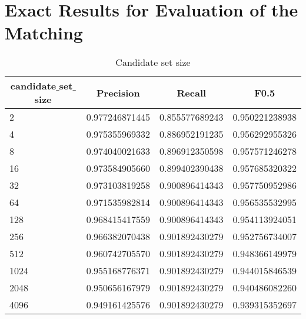\section{Exact Results for Evaluation of the Matching}


\begin{table}[h!]
\centering
\begin{tabular}{l|l|l|l}
\multicolumn{1}{c|}{\bfseries candidate$\_$set$\_$size} & \multicolumn{1}{|c|}{\bfseries Precision} & \multicolumn{1}{|c|}{\bfseries Recall} & \multicolumn{1}{|c}{\bfseries F0.5}
\\ \hline \hline


2    & 0.977246871445 & 0.855577689243 & 0.950221238938 \\ \hline
4    & 0.975355969332 & 0.886952191235 & 0.956292955326 \\ \hline
8    & 0.974040021633 & 0.896912350598 & 0.957571246278 \\ \hline
16   & 0.973584905660 & 0.899402390438 & 0.957685320322 \\ \hline
32   & 0.973103819258 & 0.900896414343 & 0.957750952986 \\ \hline
64   & 0.971535982814 & 0.900896414343 & 0.956535532995 \\ \hline
128  & 0.968415417559 & 0.900896414343 & 0.954113924051 \\ \hline
256  & 0.966382070438 & 0.901892430279 & 0.952756734007 \\ \hline
512  & 0.960742705570 & 0.901892430279 & 0.948366149979 \\ \hline
1024 & 0.955168776371 & 0.901892430279 & 0.944015846539 \\ \hline
2048 & 0.950656167979 & 0.901892430279 & 0.940486082260 \\ \hline
4096 & 0.949161425576 & 0.901892430279 & 0.939315352697 \\ \hline

\end{tabular}
\caption{Candidate set size}
\end{table}
 

